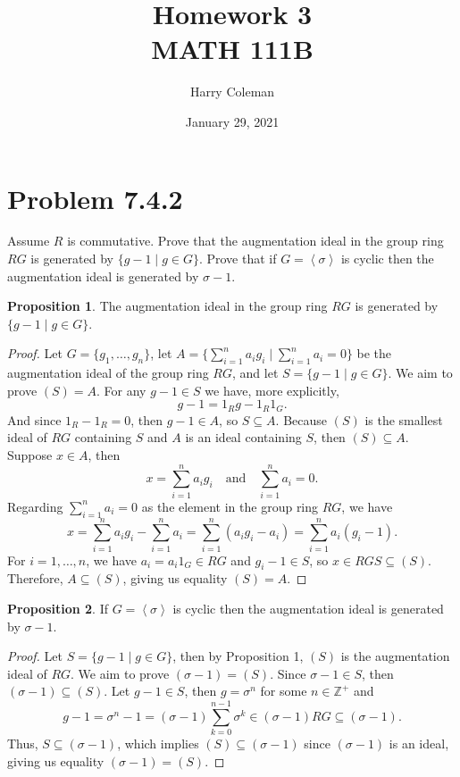 \documentclass[12pt]{article}
\title{Homework 3\\
    \large MATH 111B
}
\author{Harry Coleman}
\date{January 29, 2021}
\newenvironment{problem}
    {\begin{lrbox}{\mybox}\begin{minipage}{0.98\textwidth}}
    {\end{minipage}\end{lrbox}\begin{center}\framebox[\textwidth]{\usebox{\mybox}}\end{center}}
\theoremstyle{definition}
\newtheorem{proposition}{Proposition}
\newcommand{\isp}[1]{\quad\text{#1}\quad}
\newcommand{\Z}{\mathbb{Z}}
\newcommand{\<}{\left\langle}
\renewcommand{\>}{\right\rangle}
\begin{document}
\maketitle

\section{Problem 7.4.2}
\begin{problem}
    Assume $R$ is commutative. Prove that the augmentation ideal in the group ring $RG$ is generated by $\{g - 1 \mid g \in G\}$. Prove that if $G = \< \sigma \>$ is cyclic then the augmentation ideal is generated by $\sigma - 1$.
\end{problem}

\begin{proposition}
    The augmentation ideal in the group ring $RG$ is generated by $\{g - 1 \mid g \in G\}$.
\end{proposition}

\begin{proof}
    Let $G = \{g_1, \dots, g_n\}$, let $A = \{\sum_{i=1}^n a_i g_i \mid \sum_{i=1}^n a_i = 0\}$ be the augmentation ideal of the group ring $RG$, and let $S = \{g-1 \mid g \in G\}$. We aim to prove $(S) = A$. For any $g-1 \in S$ we have, more explicitly,
    \[
        g-1 = 1_Rg - 1_R1_G.
    \]
    And since $1_R - 1_R = 0$, then $g-1 \in A$, so $S \subseteq A$. Because $(S)$ is the smallest ideal of $RG$ containing $S$ and $A$ is an ideal containing $S$, then $(S) \subseteq A$. Suppose $x \in A$, then
    \[
        x = \sum_{i=1}^n a_i g_i \isp{and} \sum_{i=1}^n a_i = 0.
    \]
    Regarding $\sum_{i=1}^n a_i = 0$ as the element in the group ring $RG$, we have
    \[
        x
            = \sum_{i=1}^n a_i g_i - \sum_{i=1}^n a_i
            = \sum_{i=1}^n(a_ig_i - a_i)
            = \sum_{i=1}^n a_i(g_i - 1).
    \]
    For $i = 1, \dots, n$, we have $a_i = a_i1_G \in RG$ and $g_i - 1 \in S$, so $x \in RGS \subseteq (S)$. Therefore, $A \subseteq (S)$, giving us equality $(S) = A$.
    
\end{proof}

\newpage
\begin{proposition}
    If $G = \< \sigma \>$ is cyclic then the augmentation ideal is generated by $\sigma - 1$.
\end{proposition}

\begin{proof}
    Let $S = \{g - 1 \mid g \in G\}$, then by Proposition 1, $(S)$ is the augmentation ideal of $RG$. We aim to prove $(\sigma - 1) = (S)$. Since $\sigma - 1 \in S$, then $(\sigma-1) \subseteq (S)$. Let $g - 1 \in S$, then $g = \sigma^n$ for some $n \in \Z^+$ and
    \[
        g - 1 = \sigma^n - 1 = (\sigma - 1)\sum_{k=0}^{n-1} \sigma^k \in (\sigma - 1)RG \subseteq (\sigma - 1).
    \]
    Thus, $S \subseteq (\sigma - 1)$, which implies $(S) \subseteq (\sigma - 1)$ since $(\sigma - 1)$ is an ideal, giving us equality $(\sigma - 1) = (S)$.
    
\end{proof}
\end{document}
